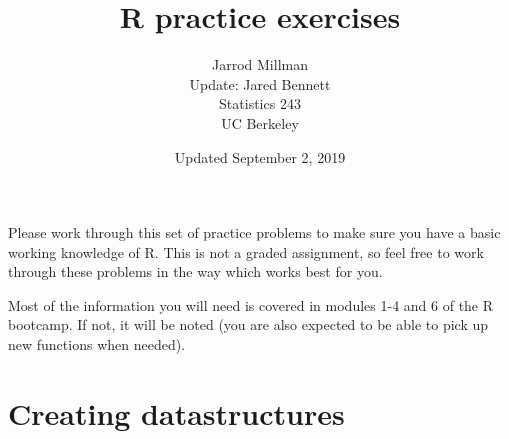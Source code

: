 \documentclass{article}
\title{R practice exercises}
\date{Updated September 2, 2019}
\author{Jarrod Millman\\ Update: Jared Bennett\\ Statistics 243\\ UC Berkeley}
\begin{document}
\maketitle

Please work through this set of practice problems to make sure you have a
basic working knowledge of R.  This is not a graded assignment,
so feel free to work through these problems in the way which works best
for you.

Most of the information you will need is covered in modules 1-4 and 6 of the R
bootcamp.  If not, it will be noted (you are also expected to be able to pick
up new functions when needed).


\section*{Creating datastructures}
\end{document}
